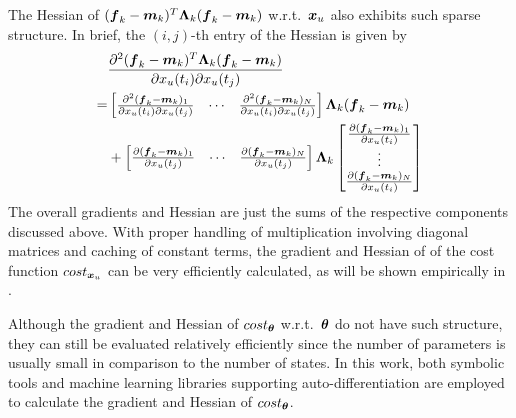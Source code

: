 The Hessian of $(\boldsymbol{f}_{k}-\boldsymbol{m}_{k})^T\boldsymbol{\Lambda}_{k}(\boldsymbol{f}_{k}-\boldsymbol{m}_{k})$ w.r.t.\ $\boldsymbol{x}_{u}$ also exhibits such sparse structure.
In brief, the $(i, j)$-th entry of the Hessian is given by
\begin{align}
    &\frac{
        \partial^{2}(\boldsymbol{f}_{k}-\boldsymbol{m}_{k})^T\boldsymbol{\Lambda}_{k}(\boldsymbol{f}_{k}-\boldsymbol{m}_{k})}{
        \partial x_{u}(t_{i})\partial x_{u}(t_{j})}
    \nonumber
    \\
    = & \begin{bmatrix}
        \frac{\partial^2(\boldsymbol{f}_{k}-\boldsymbol{m}_{k})_1}{\partial x_{u}(t_{i})\partial x_{u}(t_{j})}
        &
        \cdots
        &
        \frac{\partial^2(\boldsymbol{f}_{k}-\boldsymbol{m}_{k})_N}{\partial x_{u}(t_{i})\partial x_{u}(t_{j})}
    \end{bmatrix}
    \boldsymbol{\Lambda}_{k}(\boldsymbol{f}_{k}-\boldsymbol{m}_{k}) 
    \nonumber
    \\
    & + 
    \begin{bmatrix}
        \frac{\partial(\boldsymbol{f}_{k}-\boldsymbol{m}_{k})_1}{\partial x_{u}(t_{j})}
        &
        \cdots
        &
        \frac{\partial(\boldsymbol{f}_{k}-\boldsymbol{m}_{k})_N}{\partial x_{u}(t_{j})}
    \end{bmatrix}
    \boldsymbol{\Lambda}_{k}
    \begin{bmatrix}
        \frac{\partial(\boldsymbol{f}_{k}-\boldsymbol{m}_{k})_1}{\partial x_{u}(t_{i})}
        \\
        \vdots
        \\
        \frac{\partial(\boldsymbol{f}_{k}-\boldsymbol{m}_{k})_N}{\partial x_{u}(t_{i})}
    \end{bmatrix}
\end{align}
The overall gradients and Hessian are just the sums of the respective components discussed above.
With proper handling of multiplication involving diagonal matrices and caching of constant terms, the gradient and Hessian of of the cost function $cost_{\boldsymbol{x}_{u}}$ can be very efficiently calculated, as will be shown empirically in .

Although the gradient and Hessian of $cost_{\boldsymbol{\theta}}$  w.r.t.\ $\boldsymbol{\theta}$ do not have such structure, they can still be evaluated relatively efficiently since the number of parameters is usually small in comparison to the number of states.
In this work, both symbolic tools and machine learning libraries supporting auto-differentiation are employed to calculate the gradient and Hessian of $cost_{\boldsymbol{\theta}}$.

